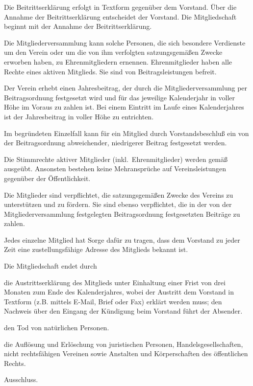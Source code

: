 \documentclass[draft]{scrartcl}
\begin{document}
\begin{contract}
Die Beitrittserklärung erfolgt in Textform gegenüber dem Vorstand. Über die
Annahme der Beitrittserklärung entscheidet der Vorstand. Die Mitgliedschaft
beginnt mit der Annahme der Beitrittserklärung.

Die Mitgliederversammlung kann solche Personen, die sich besondere Verdienste
um den Verein oder um die von ihm verfolgten satzungsgemäßen Zwecke erworben
haben, zu Ehrenmitgliedern ernennen. Ehrenmitglieder haben alle Rechte eines
aktiven Mitglieds. Sie sind von Beitragsleistungen befreit.


Der Verein erhebt einen Jahresbeitrag, der durch die Mitgliederversammlung
per Beitragsordnung festgesetzt wird und für das jeweilige Kalenderjahr in
voller Höhe im Voraus zu zahlen ist. Bei einem Eintritt im Laufe eines
Kalenderjahres ist der Jahresbeitrag in voller Höhe zu entrichten.

Im begründeten Einzelfall kann für ein Mitglied durch Vorstandsbeschluß ein
von der Beitragsordnung abweichender, niedrigerer Beitrag festgesetzt werden.


Die Stimmrechte aktiver Mitglieder (inkl.\ Ehrenmitglieder) werden gemäß
~ ausgeübt. Ansonsten bestehen
keine Mehransprüche auf Vereinsleistungen gegenüber der Öffentlichkeit.

Die Mitglieder sind verpflichtet, die satzungsgemäßen Zwecke des Vereins zu
unterstützen und zu fördern. Sie sind ebenso verpflichtet, die in der von der
Mitgliederversammlung festgelegten Beitragsordnung festgesetzten Beiträge zu
zahlen.

Jedes einzelne Mitglied hat Sorge dafür zu tragen, dass dem Vorstand zu jeder
Zeit eine zustellungsfähige Adresse des Mitglieds bekannt ist.


Die Mitgliedschaft endet durch

\begin{compactitem}
  \item die Austrittserklärung des Mitglieds unter Einhaltung einer Frist von
  drei Monaten zum Ende des Kalenderjahres, wobei der Austritt dem Vorstand in
  Textform (z.B. mittels E-Mail, Brief oder Fax) erklärt werden muss; den Nachweis
  über den Eingang der Kündigung beim Vorstand führt der Absender.
  \item den Tod von natürlichen Personen.
  \item die Auf\/lösung und Erlöschung von juristischen Personen, Handelsgesellschaften,
  nicht rechtsfähigen Vereinen sowie Anstalten und Körperschaften des öf\-fent\-lichen
  Rechts.
  \item Ausschluss.
\end{compactitem}


\end{contract}
\end{document}
